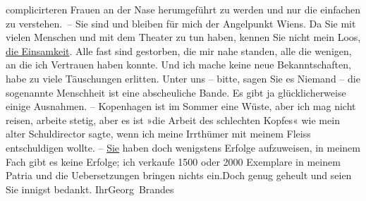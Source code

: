 \begin{ledgroupsized}[t]{13cm}
               complicirteren Frauen an der Nase herumgeführt zu werden und nur die einfachen zu
               verstehen. – Sie sind und bleiben für mich der Angelpunkt Wiens. Da Sie mit vielen Menschen und mit dem Theater zu tun
               haben, kennen Sie nicht mein Loos, \uline{die Einsamkeit}.
               Alle fast sind gestorben, die mir nahe standen, alle {\pb}die wenigen, an die ich Vertrauen
               haben konnte. Und ich mache keine neue Bekanntschaften, habe zu viele Täuschungen
               erlitten. Unter uns – bitte, sagen Sie es Niemand – die sogenannte Menschheit ist
               eine abscheuliche Bande. Es gibt ja glücklicherweise einige Ausnahmen. – Kopenhagen ist im Sommer eine Wüste, aber ich
               mag nicht reisen, arbeite stetig, aber es ist »die Arbeit des schlechten Kopfes« wie
               mein alter Schuldirector
               sagte, wenn ich meine Irrthümer mit meinem Fleiss entschuldigen wollte. – \uline{Sie} haben doch wenigstens Erfolge aufzuweisen, in
               meinem Fach gibt es keine Erfolge; ich verkaufe 1500 oder 2000 Exemplare in meinem
               Patria und die Uebersetzungen bringen nichts ein.\hspace*{2em}Doch genug geheult und seien Sie innigst bedankt. Ihr\spacefill\mbox{Georg Brandes}\pend
           
         
         \endnumbering{}\end{ledgroupsized}  \newcommand{\dateiname}{L02445}\newcommand{\titel}{Georg Brandes an Arthur Schnitzler, 12. 7. 1925}\newcommand{\editorInnen}{Martin Anton Müller und Gerd-Hermann Susen}
      